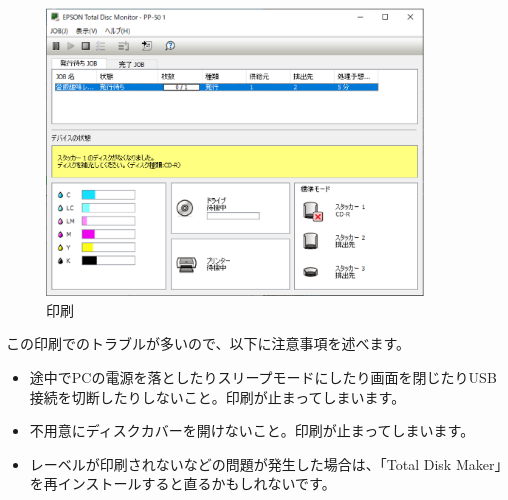 \documentclass[11pt,a4paper]{jsarticle}
\begin{document}
\begin{enumerate}
                        \begin{figure}[H]
                            \begin{center}
                            \includegraphics[width=10.0cm]{./image/pp5005.eps}
                            \caption{印刷}
                            \label{fig:pp5005}
                            \end{center}
                        \end{figure}
                            この印刷でのトラブルが多いので、以下に注意事項を述べます。
                                \begin{itemize}
                                    \item 途中でPCの電源を落としたりスリープモードにしたり画面を閉じたりUSB接続を切断したりしないこと。印刷が止まってしまいます。
                                    \item 不用意にディスクカバーを開けないこと。印刷が止まってしまいます。
                                    \item レーベルが印刷されないなどの問題が発生した場合は、「Total Disk Maker」を再インストールすると直るかもしれないです。
                                \end{itemize}
                    \end{enumerate}

                


%
%
\end{document}
